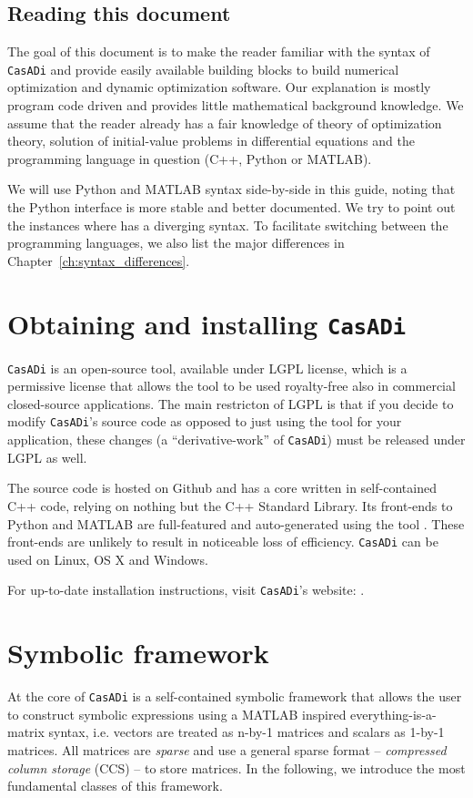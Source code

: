 \documentclass[a4paper,12pt]{book}
\newcommand{\CasADi}{\texttt{CasADi}\xspace}
\begin{document}
\section{Reading this document}
The goal of this document is to make the reader familiar with the syntax of \CasADi and provide easily available building blocks to build numerical optimization and dynamic optimization software. Our explanation is mostly program code driven and provides little mathematical background knowledge. We assume that the reader already has a fair knowledge of theory of optimization theory, solution of initial-value problems in differential equations and the programming language in question (C++, Python or MATLAB).

We will use Python and MATLAB syntax side-by-side in this guide, noting that the Python interface is more stable and better documented. We try to point out the instances where has a diverging syntax. To facilitate switching between the programming languages, we also list the major differences in Chapter~\ref{ch:syntax_differences}.

\chapter{Obtaining and installing \CasADi}
\CasADi is an open-source tool, available under LGPL license, which is a permissive license that allows the tool to be used royalty-free also in commercial closed-source applications. The main restricton of LGPL is that if you decide to modify \CasADi's source code as opposed to just using the tool for your application, these changes (a ``derivative-work'' of \CasADi) must be released under LGPL as well.

The source code is hosted on Github and has a core written in self-contained C++ code, relying on nothing but the C++ Standard Library. Its front-ends to Python and MATLAB are full-featured and auto-generated using the tool . These front-ends are unlikely to result in noticeable loss of efficiency. \CasADi can be used on Linux, OS X and Windows.

For up-to-date installation instructions, visit \CasADi's website: .

\chapter{Symbolic framework}
At the core of \CasADi is a self-contained symbolic framework that allows the user to construct symbolic expressions using a MATLAB inspired everything-is-a-matrix syntax, i.e. vectors are treated as n-by-1 matrices and scalars as 1-by-1 matrices. All matrices are \emph{sparse} and use a general sparse format -- \emph{compressed column storage} (CCS) -- to store matrices. In the following, we introduce the most fundamental classes of this framework.
\end{document}
